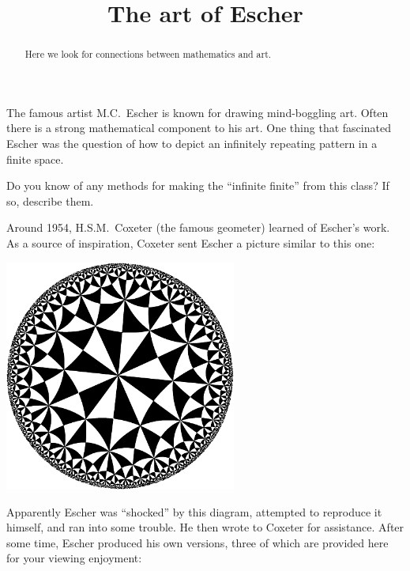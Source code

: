 \documentclass{ximera}
\title{The art of Escher}
\begin{document}
\begin{abstract}
Here we look for connections between mathematics and art.
\end{abstract}
\maketitle

The famous artist M.C.\ Escher is known for drawing mind-boggling
art. Often there is a strong mathematical component to his art. One
thing that fascinated Escher was the question of how to depict an
infinitely repeating pattern in a finite space.

\begin{problem}
  Do you know of any methods for making the ``infinite finite'' from
  this class? If so, describe them.
\end{problem}

Around 1954, H.S.M.\ Coxeter (the famous geometer) learned of Escher's
work. As a source of inspiration, Coxeter sent Escher a picture
similar to this one:
\begin{image}
  \includegraphics[width=3in]{inspiredCircleLimitIII.pdf}
\end{image}
Apparently Escher was ``shocked'' by this diagram, attempted to
reproduce it himself, and ran into some trouble. He then wrote to
Coxeter for assistance. After some time, Escher produced his own
versions, three of which are provided here for your viewing enjoyment:
\end{document}
